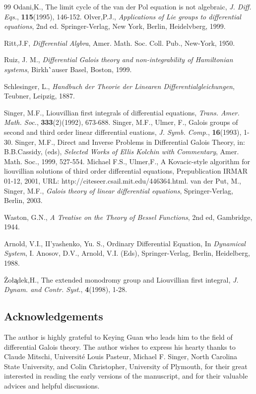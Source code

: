 \documentclass[preprint, 12pt]{elsarticle}
\numberwithin{equation}{section}
\begin{document}
\begin{thebibliography}{99}
 Odani,K., The limit cycle of the van der Pol equation
is not algebraic, \textit{J. Diff. Eqs.}, \textbf{115}(1995),
146-152.
 Olver,P.J., \textit{Applications of Lie groups to differential
equations}, 2nd ed. Springer-Verlag, New York, Berlin,
Heidelvberg, 1999.

 Ritt,J.F,  \textit{Differential Algbra},
Amer. Math. Soc. Coll. Pub., New-York, 1950.

 Ruiz, J. M., \textit{Differential Galois theory and non-integrability of Hamiltonian systems}, Birkh\``{a}user Basel, Boston, 1999.

 Schlesinger, L., \textit{Handbuch der Theorie der Linearen
Differentialgleichungen}, Teubner, Leipzig, 1887.

 Singer, M.F., Liouvillian first integrals of differential equations,
\textit{Trans. Amer. Math. Soc.},
\textbf{333}(2)(1992), 673-688.
 Singer, M.F., Ulmer, F., Galois groups of second
and third order linear differential euations, \textit{J. Symb.
Comp.}, \textbf{16}(1993), 1-30.
 Singer, M.F., Direct and Inverse Problems in Differential Galois Theory,
in: B.B.Cassidy, (eds), \textit{Selected Works of Ellis Kolchin
with Commentary}, Amer. Math. Soc., 1999, 527-554.
 Michael F.S., Ulmer,F., A Kovacic-style algorithm for liouvillian solutions of third order differential equations, Prepublication IRMAR 01-12, 2001, URL: http://citeseer.csail.mit.edu/446364.html.
 van der Put, M.,  Singer, M.F., \textit{Galois
theory of linear differential equations}, Springer-Verlag, Berlin,
2003.

 Waston, G.N., \textit{A Treatise on the Theory of
Bessel Functions}, 2nd ed, Gambridge, 1944.

 Arnold, V.I., II'yashenko, Yu. S., Ordinary Differential
Equation, In \textit{Dynamical System}, I. Anosov, D.V., Arnold,
V.I. (Eds), Springer-Verlag, Berlin, Heidelberg, 1988.

 \.{Z}o\l\c{a}dek,H., The extended monodromy group
and Liouvillian first integral, \textit{J. Dynam. and Contr.
Syst.}, \textbf{4}(1998), 1-28.
\end{thebibliography}


\subsection*{Acknowledgements}
The author is highly grateful to Keying Guan who leads 
him to the field of differential Galois theory. The author wishes
to express his hearty thanks to Claude Mitschi,
Universit\'{e} Louis Pasteur, Michael F. Singer, North
Carolina State University, and Colin Christopher,
University of Plymouth, for their great interested in reading the
early versions of the manuscript, and for their valuable advices
and helpful discussions.
\end{document}
